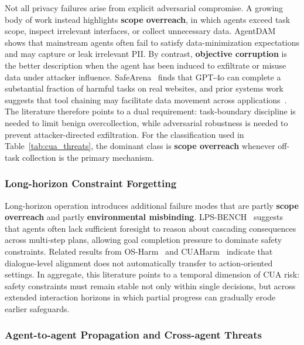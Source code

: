 Not all privacy failures arise from explicit adversarial compromise. A growing body of work instead highlights \textbf{scope overreach}, in which agents exceed task scope, inspect irrelevant interfaces, or collect unnecessary data. AgentDAM~\cite{zharmagambetov2025agentdam} shows that mainstream agents often fail to satisfy data-minimization expectations and may capture or leak irrelevant PII. By contrast, \textbf{objective corruption} is the better description when the agent has been induced to exfiltrate or misuse data under attacker influence. SafeArena~\cite{tur2025safearena} finds that GPT-4o can complete a substantial fraction of harmful tasks on real websites, and prior systems work suggests that tool chaining may facilitate data movement across applications~\cite{jones2025systematization,li2025dissonances}. The literature therefore points to a dual requirement: task-boundary discipline is needed to limit benign overcollection, while adversarial robustness is needed to prevent attacker-directed exfiltration. For the classification used in Table~\ref{tab:cua_threats}, the dominant class is \textbf{scope overreach} whenever off-task collection is the primary mechanism.

\subsubsection{Long-horizon Constraint Forgetting}

Long-horizon operation introduces additional failure modes that are partly \textbf{scope overreach} and partly \textbf{environmental misbinding}. LPS-BENCH~\cite{chen2026lps} suggests that agents often lack sufficient foresight to reason about cascading consequences across multi-step plans, allowing goal completion pressure to dominate safety constraints. Related results from OS-Harm~\cite{kuntz2025harm} and CUAHarm~\cite{tian2025measuring} indicate that dialogue-level alignment does not automatically transfer to action-oriented settings. In aggregate, this literature points to a temporal dimension of CUA risk: safety constraints must remain stable not only within single decisions, but across extended interaction horizons in which partial progress can gradually erode earlier safeguards.

\subsubsection{Agent-to-agent Propagation and Cross-agent Threats}

